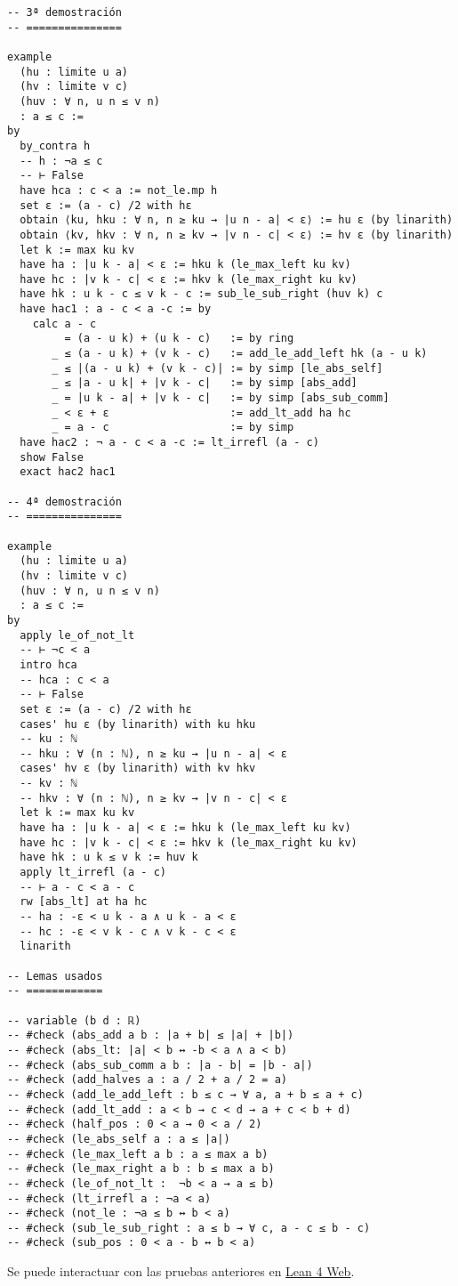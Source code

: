 \begin{verbatim}
-- 3ª demostración
-- ===============

example
  (hu : limite u a)
  (hv : limite v c)
  (huv : ∀ n, u n ≤ v n)
  : a ≤ c :=
by
  by_contra h
  -- h : ¬a ≤ c
  -- ⊢ False
  have hca : c < a := not_le.mp h
  set ε := (a - c) /2 with hε
  obtain ⟨ku, hku : ∀ n, n ≥ ku → |u n - a| < ε⟩ := hu ε (by linarith)
  obtain ⟨kv, hkv : ∀ n, n ≥ kv → |v n - c| < ε⟩ := hv ε (by linarith)
  let k := max ku kv
  have ha : |u k - a| < ε := hku k (le_max_left ku kv)
  have hc : |v k - c| < ε := hkv k (le_max_right ku kv)
  have hk : u k - c ≤ v k - c := sub_le_sub_right (huv k) c
  have hac1 : a - c < a -c := by
    calc a - c
         = (a - u k) + (u k - c)   := by ring
       _ ≤ (a - u k) + (v k - c)   := add_le_add_left hk (a - u k)
       _ ≤ |(a - u k) + (v k - c)| := by simp [le_abs_self]
       _ ≤ |a - u k| + |v k - c|   := by simp [abs_add]
       _ = |u k - a| + |v k - c|   := by simp [abs_sub_comm]
       _ < ε + ε                   := add_lt_add ha hc
       _ = a - c                   := by simp
  have hac2 : ¬ a - c < a -c := lt_irrefl (a - c)
  show False
  exact hac2 hac1

-- 4ª demostración
-- ===============

example
  (hu : limite u a)
  (hv : limite v c)
  (huv : ∀ n, u n ≤ v n)
  : a ≤ c :=
by
  apply le_of_not_lt
  -- ⊢ ¬c < a
  intro hca
  -- hca : c < a
  -- ⊢ False
  set ε := (a - c) /2 with hε
  cases' hu ε (by linarith) with ku hku
  -- ku : ℕ
  -- hku : ∀ (n : ℕ), n ≥ ku → |u n - a| < ε
  cases' hv ε (by linarith) with kv hkv
  -- kv : ℕ
  -- hkv : ∀ (n : ℕ), n ≥ kv → |v n - c| < ε
  let k := max ku kv
  have ha : |u k - a| < ε := hku k (le_max_left ku kv)
  have hc : |v k - c| < ε := hkv k (le_max_right ku kv)
  have hk : u k ≤ v k := huv k
  apply lt_irrefl (a - c)
  -- ⊢ a - c < a - c
  rw [abs_lt] at ha hc
  -- ha : -ε < u k - a ∧ u k - a < ε
  -- hc : -ε < v k - c ∧ v k - c < ε
  linarith

-- Lemas usados
-- ============

-- variable (b d : ℝ)
-- #check (abs_add a b : |a + b| ≤ |a| + |b|)
-- #check (abs_lt: |a| < b ↔ -b < a ∧ a < b)
-- #check (abs_sub_comm a b : |a - b| = |b - a|)
-- #check (add_halves a : a / 2 + a / 2 = a)
-- #check (add_le_add_left : b ≤ c → ∀ a, a + b ≤ a + c)
-- #check (add_lt_add : a < b → c < d → a + c < b + d)
-- #check (half_pos : 0 < a → 0 < a / 2)
-- #check (le_abs_self a : a ≤ |a|)
-- #check (le_max_left a b : a ≤ max a b)
-- #check (le_max_right a b : b ≤ max a b)
-- #check (le_of_not_lt :  ¬b < a → a ≤ b)
-- #check (lt_irrefl a : ¬a < a)
-- #check (not_le : ¬a ≤ b ↔ b < a)
-- #check (sub_le_sub_right : a ≤ b → ∀ c, a - c ≤ b - c)
-- #check (sub_pos : 0 < a - b ↔ b < a)
\end{verbatim}
Se puede interactuar con las pruebas anteriores en \href{https://lean.math.hhu.de/\#url=https://raw.githubusercontent.com/jaalonso/Calculemus2/main/src/Limite\_de\_sucesion\_menor\_que\_otra\_sucesion.lean}{Lean 4 Web}.


